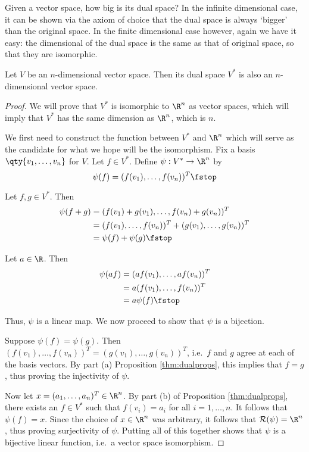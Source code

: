 Given a vector space, how big is its dual space? In the infinite dimensional case, it can be shown via the axiom of choice that the dual space is always `bigger' than the original space. In the finite dimensional case however, again we have it easy: the dimensional of the dual space is the same as that of original space, so that they are isomorphic.

\begin{theorem}
  \label{thm:ndual}
  Let \( V \) be an \( n \)-dimensional vector space. Then its dual space \( V^* \) is also an \( n \)-dimensional vector space.
\end{theorem}
\begin{proof}
  We will prove that \( V^* \) is isomorphic to \( \R^n \) as vector spaces, which will imply that \( V^* \) has the same dimension as \( \R^n \), which is \( n \).

  \vspace{3mm}

  We first need to construct the function between \( V^* \) and \( \R^n \) which will serve as the candidate for what we hope will be the isomorphism. Fix a basis \( \qty{v_1,\dots,v_n} \) for \( V \). Let \( f\in V^* \). Define \( \psi:V^*\to\R^n \) by
  \[ \psi(f)=(f(v_1),\dots,f(v_n))^T\fstop \]

  Let \( f,g\in V^* \). Then
  \begin{align*}
    \psi(f+g)&= (f(v_1)+g(v_1),\dots,f(v_n)+g(v_n))^T\\
    &= (f(v_1),\dots,f(v_n))^T+(g(v_1),\dots,g(v_n))^T\\
    &= \psi(f)+\psi(g)\fstop
  \end{align*}

  Let \( a\in\R \). Then
  \begin{align*}
    \psi(af)&=(af(v_1),\dots,af(v_n))^T\\
    &= a(f(v_1),\dots,f(v_n))^T\\
    &= a\psi(f)\fstop
  \end{align*}

  Thus, \( \psi \) is a linear map. We now proceed to show that \( \psi \) is a bijection.

  \vspace{3mm}

  Suppose \( \psi(f)=\psi(g) \). Then \( (f(v_1),\dots,f(v_n))^T=(g(v_1),\dots,g(v_n))^T \), i.e.\ \( f \) and \( g \) agree at each of the basis vectors. By part (a) Proposition \ref{thm:dualprops}, this implies that \( f=g \), thus proving the injectivity of \( \psi \).

  \vspace{3mm}

  Now let \( x=(a_1,\dots,a_n)^T\in\R^n \). By part (b) of Proposition \ref{thm:dualprops}, there exists an \( f\in V^* \) such that \( f(v_i)=a_i \) for all \( i=1,\dots, n \). It follows that \( \psi(f)=x \). Since the choice of \( x\in\R^n \) was arbitrary, it follows that \( \mathcal{R}(\psi)=\R^n \), thus proving surjectivity of \( \psi \). Putting all of this together shows that \( \psi \) is a bijective linear function, i.e.\ a vector space isomorphism.
\end{proof}

